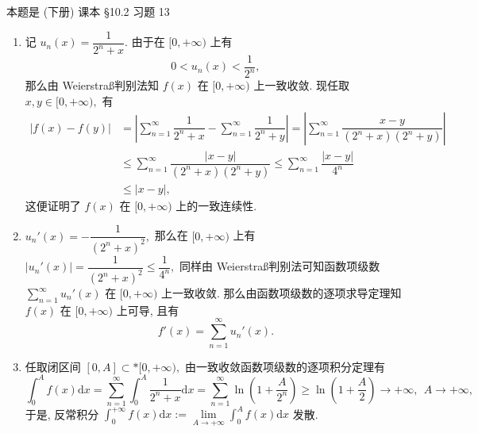 \begin{solution}
本题是 (下册) 课本 \S 10.2 习题 13

\begin{enumerate}
\item 记 $u_n(x) = \dfrac{1}{2^n + x}.$ 由于在 $[0, +\infty)$ 上有
\[0 < u_n(x) < \dfrac{1}{2^n},\]
那么由 Weierstra\ss 判别法知 $f(x)$ 在 $[0, +\infty)$ 上一致收敛. 现任取 $x, y \in [0, +\infty),$ 有
\begin{align*}
  \lvert f(x) - f(y) \rvert & = \left\lvert \sum\limits_{n=1}^\infty \dfrac{1}{2^n + x} - \sum\limits_{n=1}^\infty \dfrac{1}{2^n + y} \right\rvert = \left\lvert \sum\limits_{n=1}^\infty \dfrac{x - y}{(2^n + x)(2^n + y)} \right\rvert \\
  & \leqslant \sum\limits_{n=1}^\infty \dfrac{\lvert x - y \rvert}{(2^n + x)(2^n + y)} \leqslant \sum\limits_{n=1}^\infty \dfrac{\lvert x - y \rvert}{4^n} \\
  & \leqslant \lvert x - y \rvert,
\end{align*}
这便证明了 $f(x)$ 在 $[0, +\infty)$ 上的一致连续性.
\item $u_n'(x) = -\dfrac{1}{\left(2^n + x\right)^2},$ 那么在 $[0, +\infty)$ 上有 $\lvert u_n'(x) \rvert = \dfrac{1}{\left(2^n + x\right)^2} \leqslant \dfrac{1}{4^n},$ 同样由 Weierstra\ss 判别法可知函数项级数 $\sum\limits_{n=1}^\infty u_n'(x)$ 在 $[0, +\infty)$ 上一致收敛. 那么由函数项级数的逐项求导定理知 $f(x)$ 在 $[0, +\infty)$ 上可导, 且有
\[f'(x) = \sum\limits_{n=1}^\infty u_n'(x).\]
\item 任取闭区间 $[0, A] \subset* [0, +\infty),$ 由一致收敛函数项级数的逐项积分定理有
\[\int_0^{A} f(x) \mathrm{d} x = \sum\limits_{n=1}^\infty \int_0^{A} \dfrac{1}{2^n + x} \mathrm{d} x = \sum\limits_{n=1}^\infty \ln \left( 1 + \dfrac{A}{2^n} \right) \geqslant \ln \left( 1 + \dfrac{A}{2} \right) \to +\infty, ~~ A \to +\infty,\]
于是, 反常积分 $\int_0^{+\infty} f(x) \mathrm{d} x := \lim\limits_{A \to +\infty} \int_0^{A} f(x) \mathrm{d} x$ 发散.
\end{enumerate}
\end{solution}

